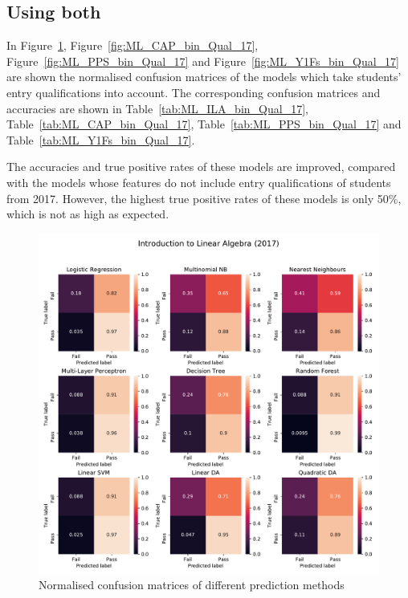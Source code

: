 \documentclass[a4paper]{report}
\begin{document}
\subsection{Using both}

In Figure~\ref{fig:ML_ILA_bin_Qual_17}, Figure~\ref{fig:ML_CAP_bin_Qual_17}, Figure~\ref{fig:ML_PPS_bin_Qual_17} and Figure~\ref{fig:ML_Y1Fs_bin_Qual_17} are shown the normalised confusion matrices of the models which take students' entry qualifications into account. The corresponding confusion matrices and accuracies are shown in Table~\ref{tab:ML_ILA_bin_Qual_17}, Table~\ref{tab:ML_CAP_bin_Qual_17}, Table~\ref{tab:ML_PPS_bin_Qual_17} and Table~\ref{tab:ML_Y1Fs_bin_Qual_17}. 

The accuracies and true positive rates of these models are improved, compared with the models whose features do not include entry qualifications of students from 2017. However, the highest true positive rates of these models is only 50\%, which is not as high as expected. 

\begin{figure}[H]
  \centering
  \includegraphics[width=\linewidth]{fig/ML_ILA_bin_Qual_17.pdf}
  \caption{\label{fig:ML_ILA_bin_Qual_17}Normalised confusion matrices of different prediction methods}
\end{figure}
\end{document}
